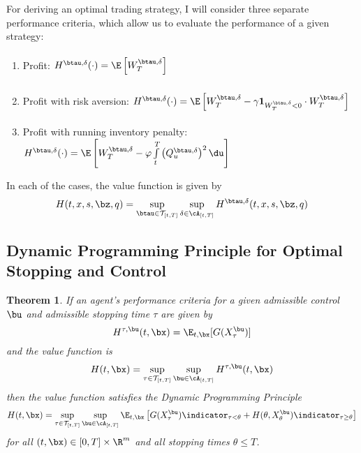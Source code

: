\documentclass[12pt]{article}
\newtheorem{theorem}{Theorem}
\begin{document}
For deriving an optimal trading strategy, I will consider three separate performance criteria, which allow us to evaluate the performance of a given strategy:
\begin{enumerate}[noitemsep, topsep=0pt]
\item Profit: $H^{\btau, \delta}(\cdot) = \E \left[ W_T^{\btau, \delta} \right]\vphantom{\int\limits_t^T}$
\item Profit with risk aversion: $H^{\btau, \delta}(\cdot) = \E \left[  W_T^{\btau, \delta} - \gamma \mathbf{1}_{W_T^{\btau, \delta}<0} \cdot W_T^{\btau, \delta} \right]\vphantom{\int\limits_t^T}$
\item Profit with running inventory penalty: $H^{\btau, \delta}(\cdot) = \E \left[  W_T^{\btau, \delta}  - \varphi \int\limits_t^T \left( Q^{\btau, \delta}_u \right)^2 \du  \right]$
\end{enumerate}

In each of the cases, the value function is given by
\begin{equation}\label{eq:valuefunction}
H(t,x,s,\bz,q) = \sup\limits_{\btau \in \mathcal{T}_{[t,T]}} \sup\limits_{\delta \in \cA_{[t,T]}} H^{\btau, \delta}(t,x,s,\bz,q)
\end{equation}

\subsection*{Dynamic Programming Principle for Optimal Stopping and Control}
\begin{theorem}
If an agent's performance criteria for a given admissible control $\bu$ and admissible stopping time $\tau$ are given by
\[ H^{\tau, \bu}(t,\bx) = \E_{t,\bx} [ G (X^{\bu}_\tau)] \]
and the value function is
\[ H(t,\bx) = \sup\limits_{\tau \in \mathcal{T}_{[t,T]}} \sup\limits_{\bu \in \cA_{[t,T]}} H^{\tau, \bu}(t,\bx) \]
then the value function satisfies the Dynamic Programming Principle
\begin{equation}
\label{eq:thmDPP}
H(t,\bx) = \sup\limits_{\tau \in \mathcal{T}_{[t,T]}} \sup\limits_{\bu \in \cA_{[t,T]}} \E_{t,\bx} \left[ G (X^{\bu}_\tau) \indicator_{\tau<\theta} + H(\theta, X^{\bu}_\theta)\indicator_{\tau \geq \theta} \right]
\end{equation}
for all $(t,\bx) \in [0,T] \times \R^m$ and all stopping times $\theta \leq T$.
\end{theorem}
\end{document}
